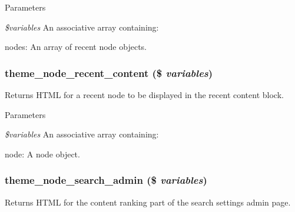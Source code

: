 \begin{DoxyParams}{Parameters}
\item[{\em \$variables}]An associative array containing:
\begin{DoxyItemize}
\item nodes: An array of recent node objects. 
\end{DoxyItemize}\end{DoxyParams}
\hypertarget{group__themeable_ga97f48d53d3d8c179a80d67fe24a85a55}{
\subsubsection[{theme\_\-node\_\-recent\_\-content}]{\setlength{\rightskip}{0pt plus 5cm}theme\_\-node\_\-recent\_\-content (\$ {\em variables})}}
\label{group__themeable_ga97f48d53d3d8c179a80d67fe24a85a55}
Returns HTML for a recent node to be displayed in the recent content block.


\begin{DoxyParams}{Parameters}
\item[{\em \$variables}]An associative array containing:
\begin{DoxyItemize}
\item node: A node object. 
\end{DoxyItemize}\end{DoxyParams}
\hypertarget{group__themeable_ga047126c1afd64a21474b5c8d1da35e00}{
\subsubsection[{theme\_\-node\_\-search\_\-admin}]{\setlength{\rightskip}{0pt plus 5cm}theme\_\-node\_\-search\_\-admin (\$ {\em variables})}}
\label{group__themeable_ga047126c1afd64a21474b5c8d1da35e00}
Returns HTML for the content ranking part of the search settings admin page.


